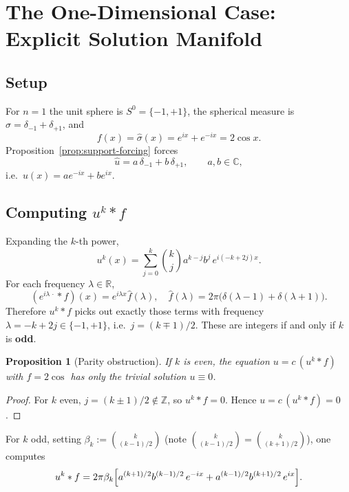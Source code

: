 \documentclass[12pt]{article}
\newtheorem{proposition}[theorem]{Proposition}
\newcommand{\R}{\mathbb{R}}
\newcommand{\C}{\mathbb{C}}
\newcommand{\Z}{\mathbb{Z}}
\newcommand{\wh}{\widehat}
\begin{document}
\section{The One-Dimensional Case: Explicit Solution Manifold}

\subsection{Setup}

For $n = 1$ the unit sphere is $S^0 = \{-1, +1\}$, the spherical measure is
$\sigma = \delta_{-1} + \delta_{+1}$, and
\[
  f(x) = \wh{\sigma}(x) = e^{ix} + e^{-ix} = 2\cos x.
\]
Proposition~\ref{prop:support-forcing} forces
\[
  \wh{u} = a\,\delta_{-1} + b\,\delta_{+1},
  \qquad a, b \in \C,
\]
i.e.\ $u(x) = a e^{-ix} + b e^{ix}$.

\subsection{Computing \texorpdfstring{$u^k \ast f$}{uk*f}}

Expanding the $k$-th power,
\[
  u^k(x) = \sum_{j=0}^{k}\binom{k}{j}a^{k-j}b^j\,e^{i(-k+2j)x}.
\]
For each frequency $\lambda \in \R$,
\[
  (e^{i\lambda\,\cdot} \ast f)(x)
    = e^{i\lambda x}\wh{f}(\lambda),
  \quad
  \wh{f}(\lambda) = 2\pi\bigl(\delta(\lambda-1)+\delta(\lambda+1)\bigr).
\]
Therefore $u^k \ast f$ picks out exactly those terms with frequency
$\lambda = -k + 2j \in \{-1, +1\}$, i.e.\ $j = (k\mp 1)/2$.
These are integers if and only if $k$ is \textbf{odd}.

\begin{proposition}[Parity obstruction]
  If $k$ is even, the equation $u = c\,(u^k\ast f)$ with $f = 2\cos$
  has only the trivial solution $u \equiv 0$.
\end{proposition}

\begin{proof}
  For $k$ even, $j = (k\pm 1)/2 \notin \Z$, so $u^k\ast f = 0$.
  Hence $u = c\,(u^k\ast f) = 0$.
\end{proof}

For $k$ odd, setting $\beta_k := \binom{k}{(k-1)/2}$ (note
$\binom{k}{(k-1)/2} = \binom{k}{(k+1)/2}$), one computes
\[
  u^k \ast f = 2\pi\beta_k
    \Bigl[a^{(k+1)/2}b^{(k-1)/2}\,e^{-ix}
         + a^{(k-1)/2}b^{(k+1)/2}\,e^{ix}\Bigr].
\]
\end{document}
